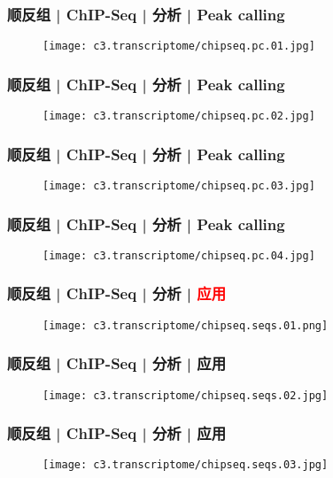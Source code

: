 \begin{frame}
  \frametitle{顺反组 | ChIP-Seq | 分析 | Peak calling}
  \begin{figure}
    \centering
    \texttt{[image: c3.transcriptome/chipseq.pc.01.jpg]}
  \end{figure}
\end{frame}

\begin{frame}
  \frametitle{顺反组 | ChIP-Seq | 分析 | Peak calling}
  \begin{figure}
    \centering
    \texttt{[image: c3.transcriptome/chipseq.pc.02.jpg]}
  \end{figure}
\end{frame}

\begin{frame}
  \frametitle{顺反组 | ChIP-Seq | 分析 | Peak calling}
  \begin{figure}
    \centering
    \texttt{[image: c3.transcriptome/chipseq.pc.03.jpg]}
  \end{figure}
\end{frame}

\begin{frame}
  \frametitle{顺反组 | ChIP-Seq | 分析 | Peak calling}
  \begin{figure}
    \centering
    \texttt{[image: c3.transcriptome/chipseq.pc.04.jpg]}
  \end{figure}
\end{frame}

\begin{frame}
  \frametitle{顺反组 | ChIP-Seq | 分析 | \textcolor{red}{应用}}
  \begin{figure}
    \centering
    \texttt{[image: c3.transcriptome/chipseq.seqs.01.png]}
  \end{figure}
\end{frame}

\begin{frame}
  \frametitle{顺反组 | ChIP-Seq | 分析 | 应用}
  \begin{figure}
    \centering
    \texttt{[image: c3.transcriptome/chipseq.seqs.02.jpg]}
  \end{figure}
\end{frame}

\begin{frame}
  \frametitle{顺反组 | ChIP-Seq | 分析 | 应用}
  \begin{figure}
    \centering
    \texttt{[image: c3.transcriptome/chipseq.seqs.03.jpg]}
  \end{figure}
\end{frame}

